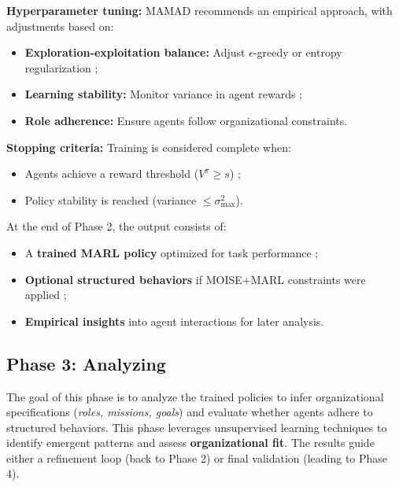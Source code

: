 \documentclass[pdflatex,sn-mathphys-num]{sn-jnl}%
\theoremstyle{thmstyleone}%
\theoremstyle{thmstyletwo}%
\theoremstyle{thmstylethree}%
\begin{document}
\noindent \textbf{Hyperparameter tuning:}
MAMAD recommends an empirical approach, with adjustments based on:
\begin{itemize}
    \item \textbf{Exploration-exploitation balance:} Adjust $\epsilon$-greedy or entropy regularization ;
    \item \textbf{Learning stability:} Monitor variance in agent rewards ;
    \item \textbf{Role adherence:} Ensure agents follow organizational constraints.
\end{itemize}

\noindent \textbf{Stopping criteria:}
Training is considered complete when:
\begin{itemize}
    \item Agents achieve a reward threshold ($V^{\pi} \geq s$) ;
    \item Policy stability is reached (variance $\leq \sigma_{\max}^2$).
\end{itemize}

At the end of Phase 2, the output consists of:
\begin{itemize}
    \item A \textbf{trained MARL policy} optimized for task performance ;
    \item \textbf{Optional structured behaviors} if MOISE+MARL constraints were applied ;
    \item \textbf{Empirical insights} into agent interactions for later analysis.
\end{itemize}


\subsection{Phase 3: Analyzing}

The goal of this phase is to analyze the trained policies to infer organizational specifications (\textit{roles, missions, goals}) and evaluate whether agents adhere to structured behaviors. This phase leverages unsupervised learning techniques to identify emergent patterns and assess \textbf{organizational fit}. The results guide either a refinement loop (back to Phase 2) or final validation (leading to Phase 4).
\end{document}
